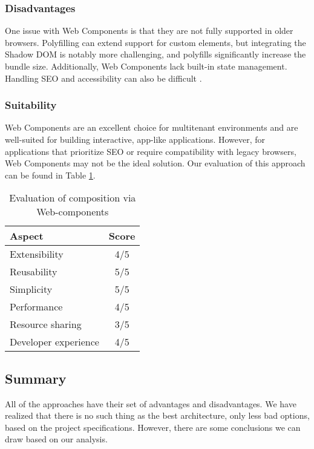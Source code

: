 \subsubsection{Disadvantages}
One issue with Web Components is that they are not fully supported in older browsers. Polyfilling can extend support for custom elements, but integrating the Shadow DOM is notably more challenging, and polyfills significantly increase the bundle size. Additionally, Web Components lack built-in state management. Handling SEO and accessibility can also be difficult \cite{Geers}\cite{MezzaliraBuildingMf}.

\subsubsection{Suitability}
Web Components are an excellent choice for multitenant environments and are well-suited for building interactive, app-like applications. However, for applications that prioritize SEO or require compatibility with legacy browsers, Web Components may not be the ideal solution.  Our evaluation of this approach can be found in Table \ref{table:web-compoents-evaluation}. 
\begin{table}[h]
  \centering
  \begin{tabular}{|p{4cm}|c|}
    \hline
      \textbf{Aspect} & \textbf{Score} \\
    \hline
      Extensibility & 4/5 \\
    \hline
      Reusability & 5/5 \\
    \hline
      Simplicity & 5/5 \\
    \hline
      Performance & 4/5 \\
    \hline
      Resource sharing & 3/5 \\
    \hline
      Developer experience & 4/5 \\
    \hline
  \end{tabular}
  \caption{Evaluation of composition via Web-components}
  \label{table:web-compoents-evaluation}
\end{table}

\subsection{Summary}
All of the approaches have their set of advantages and disadvantages. We have realized that there is no such thing as the best architecture, only less bad options, based on the project specifications. However, there are some conclusions we can draw based on our analysis.

